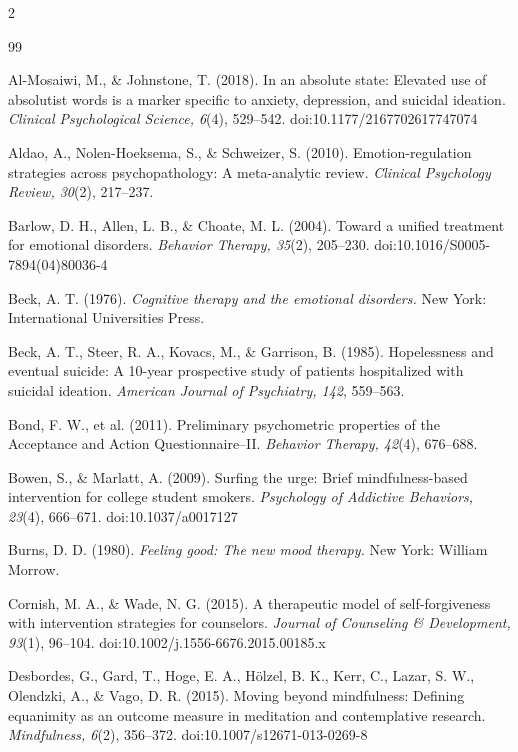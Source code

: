\documentclass[10pt]{article}
\theoremstyle{definition}
\theoremstyle{remark}
\begin{document}
\begin{multicols}{2}
\begin{thebibliography}{99}\footnotesize
\setlength{\itemsep}{1pt}

Al-Mosaiwi, M., \& Johnstone, T. (2018). In an absolute state: Elevated use of absolutist words is a marker specific to anxiety, depression, and suicidal ideation. \emph{Clinical Psychological Science, 6}(4), 529--542. doi:10.1177/2167702617747074

Aldao, A., Nolen-Hoeksema, S., \& Schweizer, S. (2010). Emotion-regulation strategies across psychopathology: A meta-analytic review. \emph{Clinical Psychology Review, 30}(2), 217--237.

Barlow, D. H., Allen, L. B., \& Choate, M. L. (2004). Toward a unified treatment for emotional disorders. \emph{Behavior Therapy, 35}(2), 205--230. doi:10.1016/S0005-7894(04)80036-4

Beck, A. T. (1976). \emph{Cognitive therapy and the emotional disorders.} New York: International Universities Press.

Beck, A. T., Steer, R. A., Kovacs, M., \& Garrison, B. (1985). Hopelessness and eventual suicide: A 10-year prospective study of patients hospitalized with suicidal ideation. \emph{American Journal of Psychiatry, 142}, 559--563.

Bond, F. W., et al. (2011). Preliminary psychometric properties of the Acceptance and Action Questionnaire--II. \emph{Behavior Therapy, 42}(4), 676--688.

Bowen, S., \& Marlatt, A. (2009). Surfing the urge: Brief mindfulness-based intervention for college student smokers. \emph{Psychology of Addictive Behaviors, 23}(4), 666--671. doi:10.1037/a0017127

Burns, D. D. (1980). \emph{Feeling good: The new mood therapy.} New York: William Morrow.

Cornish, M. A., \& Wade, N. G. (2015). A therapeutic model of self-forgiveness with intervention strategies for counselors. \emph{Journal of Counseling \& Development, 93}(1), 96--104. doi:10.1002/j.1556-6676.2015.00185.x

Desbordes, G., Gard, T., Hoge, E. A., H\"olzel, B. K., Kerr, C., Lazar, S. W., Olendzki, A., \& Vago, D. R. (2015). Moving beyond mindfulness: Defining equanimity as an outcome measure in meditation and contemplative research. \emph{Mindfulness, 6}(2), 356--372. doi:10.1007/s12671-013-0269-8


\end{thebibliography}
\end{multicols}
\end{document}
